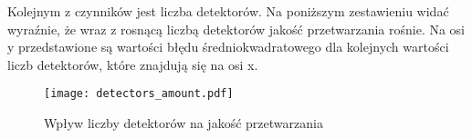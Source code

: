 \documentclass{article}
\begin{document}
Kolejnym z czynników jest liczba detektorów. Na poniższym zestawieniu widać wyraźnie, że wraz z rosnącą liczbą detektorów jakość przetwarzania rośnie. Na osi y przedstawione są wartości błędu średniokwadratowego dla kolejnych wartości liczb detektorów, które znajdują się na osi x. 

\begin{figure}[!htbp]
\begin{center}
\texttt{[image: detectors\_amount.pdf]}
\end{center}
\caption{Wpływ liczby detektorów na jakość przetwarzania}
\label{fig:detectors_amount}
\end{figure}





\end{document}
